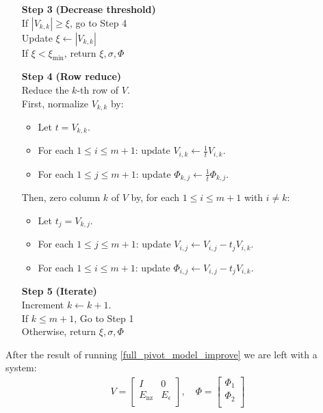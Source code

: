 \documentclass{article}
\theoremstyle{case}
\newcommand{\ximin}{{\xi_{\textrm{min}}}}
\newcommand{\lunonzero}{{E_{\textrm{nz}}}}
\newcommand{\lusmall}{{E_{\epsilon}}}
\begin{document}
\begin{algorithm}[H]
\begin{itemize}
        
        \item[\textbf{Step 3}] \textbf{(Decrease threshold)} \\
        	If $|V_{k,k}| \ge \xi$, go to Step 4 \\
        	Update $\xi \gets |V_{k, k}|$ \\
        	If $\xi < \ximin$, return $\xi, \sigma, \Phi$ \\
        \item[\textbf{Step 4}] \textbf{(Row reduce)} \\
        	Reduce the $k$-th row of $V$.\\
        	First, normalize $V_{k, k}$ by:
        	\begin{itemize}
        		\item Let $t = V_{k, k}$.
        		\item For each $1 \le i \le m+1$: update $V_{i, k} \gets \frac 1 t V_{i, k}$.
        		\item For each $1 \le j \le m+1$: update $\Phi_{k, j} \gets \frac 1 t \Phi_{k, j}$.
        	\end{itemize}
        	Then, zero column $k$ of $V$ by, for each $1 \le i \le m+1$ with $i \ne k$:
        	\begin{itemize}
        		\item Let $t_j = V_{k, j}$.
        		\item For each $1\le j \le m+1$: update $V_{i, j} \gets V_{i, j} - t_j V_{i, k}$.
        		\item For each $1\le i \le m+1$: update $\Phi_{i, j} \gets V_{i, j} - t_j V_{i, k}$.
        	\end{itemize}
        	
        	
        \item[\textbf{Step 5}] \textbf{(Iterate)} \\
        	Increment $k \gets k + 1$. \\
        	If $k \le m+1$, Go to Step 1 \\
        	Otherwise, return $\xi, \sigma, \Phi$
    \end{itemize}
\end{algorithm}


After the result of running \cref{full_pivot_model_improve} we are left with a system:
\begin{align*}
V = \begin{bmatrix}
I & 0 \\
\lunonzero  & \lusmall \\
\end{bmatrix}, \quad \Phi = \begin{bmatrix}
\Phi_1 \\
\Phi_2 \\
\end{bmatrix}
\end{align*}
\end{document}
